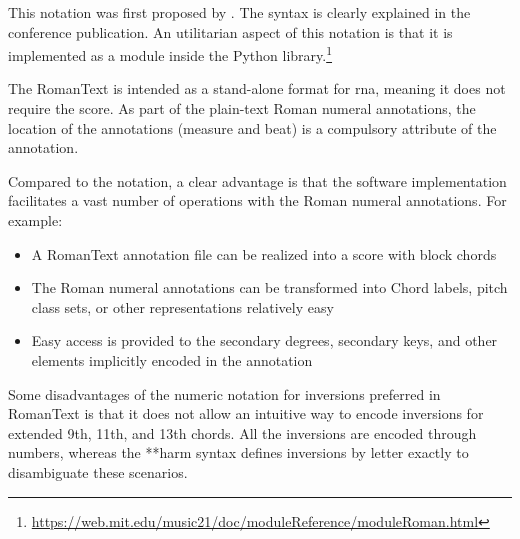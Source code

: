 

This notation was first proposed by
\textcite{gotham2019romantext}. The syntax is clearly
explained in the conference publication. An utilitarian
aspect of this notation is that it is implemented as a
module inside the  Python
library.\footnote{\href{https://web.mit.edu/music21/doc/moduleReference/moduleRoman.html}{https://web.mit.edu/music21/doc/moduleReference/moduleRoman.html}}


The RomanText is intended as a stand-alone format for
\gls{rna}, meaning it does not require the score. As part of
the plain-text Roman numeral annotations, the location of
the annotations (measure and beat) is a compulsory attribute
of the annotation.

Compared to the  notation, a clear advantage is
that the software implementation facilitates a vast number
of operations with the Roman numeral annotations. For
example:

\begin{itemize}
    \item A RomanText annotation file can be realized into a
    score with block chords
    \item The Roman numeral annotations can be transformed
    into Chord labels, pitch class sets, or other
    representations relatively easy
    \item Easy access is provided to the secondary degrees,
    secondary keys, and other elements implicitly encoded in
    the annotation
\end{itemize}

Some disadvantages of the numeric notation for inversions
preferred in RomanText is that it does not allow an
intuitive way to encode inversions for extended 9th, 11th,
and 13th chords. All the inversions are encoded through
numbers, whereas the **harm syntax defines inversions by
letter exactly to disambiguate these scenarios.
